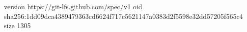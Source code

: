 version https://git-lfs.github.com/spec/v1
oid sha256:1dd09dca4389479363cd6624f717c5621147a0383d2f5598e32dd57205f565c4
size 1305
